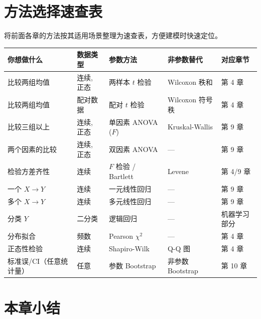 \section{方法选择速查表}

将前面各章的方法按其适用场景整理为速查表，方便建模时快速定位。

\begin{center}
\renewcommand{\arraystretch}{1.3}
\footnotesize
\begin{tabular}{p{2.8cm}|p{2.5cm}|p{2.5cm}|p{2.5cm}|p{2.5cm}}
\toprule
\textbf{你想做什么} & \textbf{数据类型} & \textbf{参数方法} & \textbf{非参数替代} & \textbf{对应章节} \\
\midrule
比较两组均值   & 连续, 正态    & 两样本 $t$ 检验        & Wilcoxon 秩和    & 第 4 章 \\
比较两组均值   & 配对数据      & 配对 $t$ 检验           & Wilcoxon 符号秩  & 第 4 章 \\
比较三组以上   & 连续, 正态    & 单因素 ANOVA ($F$)     & Kruskal-Wallis   & 第 9 章 \\
两个因素的比较 & 连续, 正态    & 双因素 ANOVA            & ---              & 第 9 章 \\
检验方差齐性   & 连续          & $F$ 检验 / Bartlett    & Levene           & 第 4/9 章 \\
一个 $X \to Y$ & 连续          & 一元线性回归            & ---              & 第 9 章 \\
多个 $X \to Y$ & 连续          & 多元线性回归            & ---              & 第 9 章 \\
分类 $Y$       & 二分类        & 逻辑回归                & ---              & 机器学习部分 \\
分布拟合       & 频数          & Pearson $\chi^2$       & ---              & 第 4 章 \\
正态性检验     & 连续          & Shapiro-Wilk            & Q-Q 图           & 第 4 章 \\
标准误/CI（任意统计量）& 任意    & 参数 Bootstrap         & 非参数 Bootstrap & 第 10 章 \\
\bottomrule
\end{tabular}
\end{center}

\section*{本章小结}

